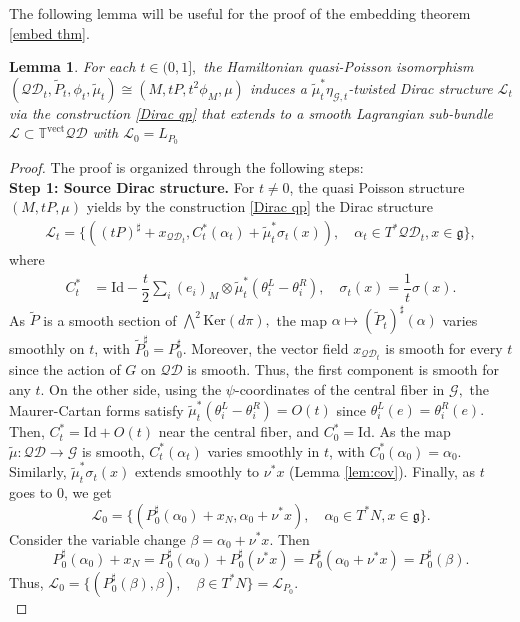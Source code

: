 \documentclass[reqno]{amsart}
\theoremstyle{plain}
\newtheorem{Lem}[Thm]{Lemma}
\theoremstyle{definition}
\newcommand{\QD}{\mathcal{QD}}
\newcommand{\G}{\mathcal{G}}
\newcommand{\g}{\mathfrak{g}}
\newcommand{\too}{\longrightarrow}
\newcommand{\mtoo}{\longmapsto}
\renewcommand{\L}{\mathcal{L}}
\newcommand{\Ker}{\text{Ker}}
\begin{document}
The following lemma will be useful for the proof of the embedding theorem \ref{embed thm}.

\begin{Lem} \label{embd lem}
For each $t \in (0,1],$ the Hamiltonian quasi-Poisson isomorphism $(\QD_t,\tilde{P}_t,\phi_t,\tilde{\mu}_t) \cong (M,tP,t^{2}\phi_M,\mu)$ induces a $\tilde{\mu}_{t}^{*}\eta_{\G,t}$-twisted Dirac structure $\L_t$ via the construction \ref{Dirac qp} that extends to a smooth Lagrangian sub-bundle $\L \subset \mathbb{T}^{\text{vect}}\QD$ with $\L_0 = L_{P_0}$
\end{Lem}

\begin{proof}

The proof is organized through the following steps: \\


\noindent\textbf{Step 1: Source Dirac structure.} For $t\neq 0$, the quasi Poisson structure $(M,tP,\mu)$ yields by the construction \ref{Dirac qp} the Dirac structure \begin{align*}
    \L_t = \{((tP)^{\sharp} + x_{\QD_t}, C_{t}^{*}(\alpha_t) + \tilde{\mu}_t^{*}\sigma_t(x)), \quad \alpha_t \in T^{*}\QD_t, x\in \g\},
\end{align*}
where \begin{align*}
    C^{*}_{t} &= \mathrm{Id} - \dfrac{t}{2} \sum_{i} (e_i)_{M}\otimes \tilde{\mu}_{t}^{*}(\theta^{L}_i - \theta^{R}_i), \quad \sigma_{t}(x) = \dfrac{1}{t} \sigma(x).
\end{align*}
As $\tilde{P}$ is a smooth section of $\bigwedge^{2} \Ker(d\pi),$ the map $\alpha \mtoo (\tilde{P}_{t})^{\sharp}(\alpha)$ varies smoothly on $t$, with $\tilde{P}_{0}^{\sharp} = P_0^{\sharp}.$ Moreover, the vector field $x_{\QD_t}$ is smooth for every $t$ since the action of $G$ on $\QD$ is smooth. Thus, the first component is smooth for any $t.$ On the other side, using the $\psi$-coordinates of the central fiber in $\G,$ the Maurer-Cartan forms satisfy $\tilde{\mu}_{t}^{*}(\theta^{L}_i - \theta^{R}_i) = O(t)$ since $\theta^{L}_i(e) = \theta^{R}_i(e).$ Then, $C^{*}_{t} = \mathrm{Id} + O(t)$ near the central fiber, and $C^{*}_0 = \mathrm{Id}$.  As the map $\tilde{\mu}: \QD \too \G$ is smooth, $C^{*}_{t}(\alpha_t)$ varies smoothly in $t$, with $C^{*}_{0}(\alpha_0) = \alpha_{0}.$ Similarly, $\tilde{\mu}^{*}_{t}\sigma_{t}(x)$ extends smoothly to $\nu^{*}x$ (Lemma \ref{lem:cov}). Finally, as $t$ goes to 0, we get \[
\L_{0} = \{(P_{0}^{\sharp}(\alpha_0) + x_N, \alpha_0 + \nu^{*}x), \quad \alpha_0 \in T^{*}N, x\in \g\}.
\]
Consider the variable change $\beta = \alpha_0 + \nu^{*}x.$ Then \[  
P_{0}^{\sharp}(\alpha_0) + x_N = P_{0}^{\sharp}(\alpha_0) + P_{0}^{\sharp}(\nu^{*}x) = P_{0}^{\sharp}(\alpha_0 + \nu^{*}x) = P^{\sharp}_{0}(\beta). 
\]
Thus, $\L_{0} = \{(P^{\sharp}_{0}(\beta),\beta), \quad \beta \in T^{*}N\} = \L_{P_0}.$\\



\end{proof}
\end{document}
